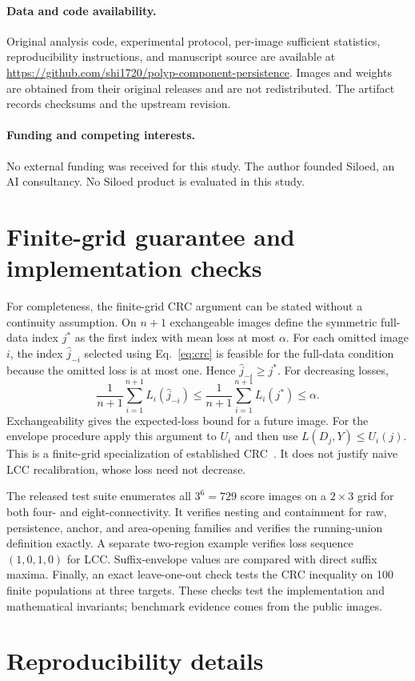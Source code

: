 \documentclass[11pt,a4paper]{article}
\begin{document}
\paragraph{Data and code availability.}
Original analysis code, experimental protocol, per-image sufficient statistics, reproducibility instructions, and manuscript source are available at \url{https://github.com/shi1720/polyp-component-persistence}. Images and weights are obtained from their original releases and are not redistributed. The artifact records checksums and the upstream revision.
\paragraph{Funding and competing interests.}
No external funding was received for this study. The author founded Siloed, an AI consultancy. No Siloed product is evaluated in this study.




\appendix
\section{Finite-grid guarantee and implementation checks}
For completeness, the finite-grid CRC argument can be stated without a continuity assumption. On $n+1$ exchangeable images define the symmetric full-data index $j^*$ as the first index with mean loss at most $\alpha$. For each omitted image $i$, the index $\widehat j_{-i}$ selected using Eq.~\eqref{eq:crc} is feasible for the full-data condition because the omitted loss is at most one. Hence $\widehat j_{-i}\ge j^*$. For decreasing losses,
\[
 \frac{1}{n+1}\sum_{i=1}^{n+1}L_i(\widehat j_{-i})
 \le\frac{1}{n+1}\sum_{i=1}^{n+1}L_i(j^*)\le\alpha.
\]
Exchangeability gives the expected-loss bound for a future image. For the envelope procedure apply this argument to $U_i$ and then use $L(D_j,Y)\le U_i(j)$. This is a finite-grid specialization of established CRC~\cite{crc}. It does not justify naive LCC recalibration, whose loss need not decrease.

The released test suite enumerates all $3^6=729$ score images on a $2\times3$ grid for both four- and eight-connectivity. It verifies nesting and containment for raw, persistence, anchor, and area-opening families and verifies the running-union definition exactly. A separate two-region example verifies loss sequence $(1,0,1,0)$ for LCC. Suffix-envelope values are compared with direct suffix maxima. Finally, an exact leave-one-out check tests the CRC inequality on 100 finite populations at three targets. These checks test the implementation and mathematical invariants; benchmark evidence comes from the public images.

\section{Reproducibility details}


\end{document}
